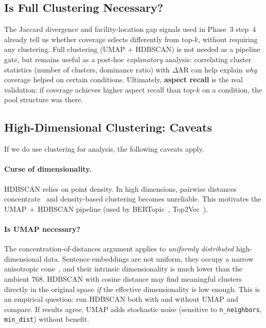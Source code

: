 \documentclass[11pt,a4paper]{article}
\newcommand{\field}[1]{\nolinkurl{#1}}
\begin{document}
\subsection{Is Full Clustering Necessary?}
\label{sec:simpler-validation}
The Jaccard divergence and facility-location gap signals used in Phase~3 step~4 already tell us whether coverage selects differently from top-$k$, without requiring any clustering. Full clustering (UMAP + HDBSCAN) is not needed as a pipeline gate, but remains useful as a post-hoc \emph{explanatory} analysis: correlating cluster statistics (number of clusters, dominance ratio) with $\Delta$AR can help explain \emph{why} coverage helped on certain conditions. Ultimately, \textbf{aspect recall} is the real validation: if coverage achieves higher aspect recall than top-$k$ on a condition, the pool structure was there.

\subsection{High-Dimensional Clustering: Caveats}
\label{sec:clustering-caveats}

If we do use clustering for analysis, the following caveats apply.

\paragraph{Curse of dimensionality.}
HDBSCAN relies on point density.  In high dimensions, pairwise distances concentrate~\cite{aggarwal2001surprising} and density-based clustering becomes unreliable.  This motivates the UMAP$\,+\,$HDBSCAN pipeline (used by BERTopic~\cite{grootendorst2022bertopic}, Top2Vec~\cite{angelov2020top2vec}).

\paragraph{Is UMAP necessary?}
\label{sec:umap-necessity}
The concentration-of-distances argument applies to \emph{uniformly distributed} high-dimensional data.  Sentence embeddings are not uniform, they occupy a narrow anisotropic cone~\cite{ethayarajh2019contextual}, and their intrinsic dimensionality is much lower than the ambient 768.  HDBSCAN with cosine distance may find meaningful clusters directly in the original space \emph{if} the effective dimensionality is low enough.  This is an empirical question: run HDBSCAN both with and without UMAP and compare.  If results agree, UMAP adds stochastic noise (sensitive to \field{n\_neighbors}, \field{min\_dist}) without benefit.
\end{document}
